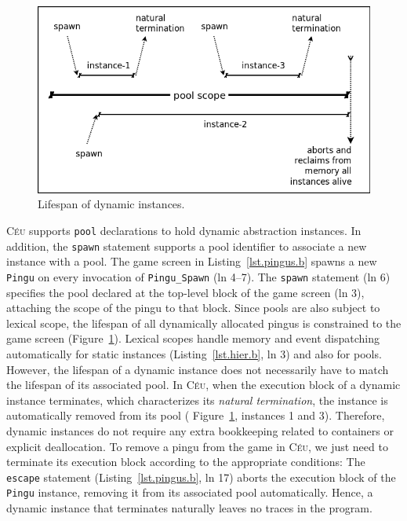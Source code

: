 \documentclass[10pt, conference, compsocconf]{IEEEtran}
\newcommand{\CEU}{\textsc{C\'{e}u}\xspace}
\newcommand{\code}[1] {{\small{\texttt{#1}}}}
\begin{document}
\begin{figure}
\centering
\includegraphics[width=\columnwidth]{pool}
\caption{Lifespan of dynamic instances.
\label{fig.pool}
}
\end{figure}

\CEU supports \code{pool} declarations to hold dynamic abstraction instances.
In addition, the \code{spawn} statement supports a pool identifier to associate
a new instance with a pool.
%
The game screen in Listing~\ref{lst.pingus.b} spawns a new \code{Pingu} on every
invocation of \code{Pingu\_Spawn} (ln 4--7).
%
The \code{spawn} statement (ln 6) specifies the pool declared at the top-level
block of the game screen (ln 3), attaching the scope of the pingu to that
block.
Since pools are also subject to lexical scope, the lifespan of all dynamically
allocated pingus is constrained to the game screen (Figure~\ref{fig.pool}).
%
Lexical scopes handle memory and event dispatching automatically for static
instances (Listing~\ref{lst.hier.b}, ln 3) and also for pools.
However, the lifespan of a dynamic instance does not necessarily have to match
the lifespan of its associated pool.
In \CEU, when the execution block of a dynamic instance terminates, which
characterizes its \emph{natural termination}, the instance is automatically
removed from its pool ( Figure~\ref{fig.pool}, instances 1 and 3).
Therefore, dynamic instances do not require any extra bookkeeping related to 
containers or explicit deallocation.
%
To remove a pingu from the game in \CEU, we just need to terminate its execution
block according to the appropriate conditions:
%
The \code{escape} statement (Listing~\ref{lst.pingus.b}, ln 17) aborts the
execution block of the \code{Pingu} instance, removing it from its associated
pool automatically.
Hence, a dynamic instance that terminates naturally leaves no traces in the 
program.
\end{document}
